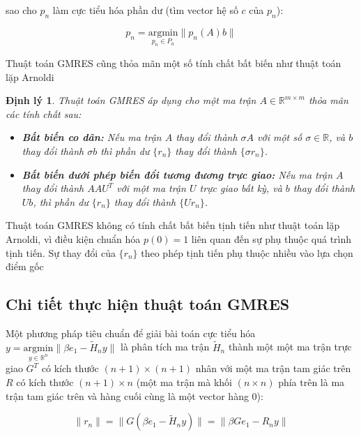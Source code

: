 \documentclass[14pt, a4paper]{article}
\numberwithin{equation}{section}
\numberwithin{algorithm}{section}
\numberwithin{figure}{section}
\newtheorem{dl}{Định lý}
\numberwithin{dl}{section}
\numberwithin{md}{section}
\numberwithin{bd}{section}
\numberwithin{dn}{section}
\begin{document}
sao cho $p_n$ làm cực tiểu hóa phần dư (tìm vector hệ số $c$ của $p_n$):

\begin{equation} \label{eq:Find-Polynomial}
    p_n = \underset{p_n \in P_n}{\mathrm{argmin}} \lVert p_n(A)b \rVert
\end{equation}

Thuật toán GMRES cũng thỏa mãn một số tính chất bất biến như thuật toán lặp Arnoldi

\begin{dl}
    Thuật toán GMRES áp dụng cho một ma trận $A \in \mathbb{R}^{m \times m}$ thỏa mãn các tính chất sau:

    \begin{itemize}
        \item \textbf{Bất biến co dãn:} Nếu ma trận $A$ thay đổi thành $\sigma A$ với một số $\sigma \in \mathbb{R}$, và $b$ thay đổi thành $\sigma b$ thì phần dư $\lbrace r_n \rbrace$ thay đổi thành $\lbrace \sigma r_n \rbrace$.
        \item \textbf{Bất biến dưới phép biến đổi tương đương trực giao:} Nếu ma trận $A$ thay đổi thành $A A U^T$ với một ma trận $U$ trực giao bất kỳ, và $b$ thay đổi thành $Ub$, thì phần dư $\lbrace r_n \rbrace$ thay đổi thành $\lbrace U r_n \rbrace$.
    \end{itemize}
\end{dl}

Thuật toán GMRES không có tính chất bất biến tịnh tiến như thuật toán lặp Arnoldi, vì điều kiện chuẩn hóa $p(0)=1$ liên quan đến sự phụ thuộc quá trình tịnh tiến. Sự thay đổi của $\lbrace r_n \rbrace$ theo phép tịnh tiến phụ thuộc nhiều vào lựa chọn điểm gốc

\subsection{Chi tiết thực hiện thuật toán GMRES}

Một phương pháp tiêu chuẩn để giải bài toán cực tiểu hóa $y = \underset{y \in \mathbb{R}^{n}}{\mathrm{argmin}} \lVert \beta e_1 - \widetilde{H}_n y \rVert$ là phân tích ma trận $\widetilde{H}_n$ thành một một ma trận trực giao $G^T$ có kích thước $(n+1) \times (n+1)$ nhân với một ma trận tam giác trên $R$ có kích thước $(n+1) \times n$ (một ma trận mà khối $(n \times n)$ phía trên là ma trận tam giác trên và hàng cuối cùng là một vector hàng 0):

\begin{equation} \label{eq:Givens-Apply}
    \lVert r_n \rVert = \lVert G(\beta e_1 - \widetilde{H}_n y) \rVert = \lVert \beta G e_1 - R_n y \rVert
\end{equation}
\end{document}
